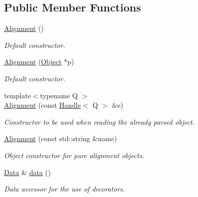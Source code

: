 \subsection*{Public Member Functions}
\begin{DoxyCompactItemize}
\item 
\hyperlink{class_d_d4hep_1_1_alignments_1_1_alignment_a3b4f4e5289181ce34cf88d4d59d40ad3}{Alignment} ()
\begin{DoxyCompactList}\small\item\em Default constructor. \item\end{DoxyCompactList}\item 
\hyperlink{class_d_d4hep_1_1_alignments_1_1_alignment_afb90531c93e16959b04cfe00ede8e9a1}{Alignment} (\hyperlink{class_d_d4hep_1_1_alignments_1_1_alignment_data}{Object} $\ast$p)
\begin{DoxyCompactList}\small\item\em Default constructor. \item\end{DoxyCompactList}\item 
{\footnotesize template$<$typename Q $>$ }\\\hyperlink{class_d_d4hep_1_1_alignments_1_1_alignment_aea881ba23fa6887672dc5ff0b2bb7025}{Alignment} (const \hyperlink{class_d_d4hep_1_1_handle}{Handle}$<$ Q $>$ \&e)
\begin{DoxyCompactList}\small\item\em Constructor to be used when reading the already parsed object. \item\end{DoxyCompactList}\item 
\hyperlink{class_d_d4hep_1_1_alignments_1_1_alignment_afe496862cf06bb5ba006b6c20362e2b1}{Alignment} (const std::string \&name)
\begin{DoxyCompactList}\small\item\em Object constructor for pure alignment objects. \item\end{DoxyCompactList}\item 
\hyperlink{class_d_d4hep_1_1_alignments_1_1_alignment_data}{Data} \& \hyperlink{class_d_d4hep_1_1_alignments_1_1_alignment_a98f34faa8c45525335ebfae7f2506e8c}{data} ()
\begin{DoxyCompactList}\small\item\em Data accessor for the use of decorators. \item\end{DoxyCompactList}\item 

\end{DoxyCompactItemize}
